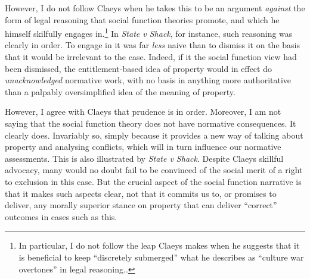 However, I do not follow Claeys when he takes this to be an argument {\it against} the form of legal reasoning that social function theories promote, and which he himself skilfully engages in.\footnote{In particular, I do not follow the leap Claeys makes when he suggests that it is beneficial to keep ``discretely submerged'' what he describes as ``culture war overtones'' in legal reasoning.\cite[947]{claeys09}.} In {\it State v Shack}, for instance, such reasoning was clearly in order. To engage in it was far {\it less} naive than to dismiss it on the basis that it would be irrelevant to the case. Indeed, if it the social function view had been dismissed, the entitlement-based idea of property would in effect do {\it unacknowledged} normative work, with no basis in anything more authoritative than a palpably oversimplified idea of the meaning of property. 

However, I agree with Claeys that prudence is in order. Moreover, I am not saying that the social function theory does not have normative consequences. It clearly does. Invariably so, simply because it provides a new way of talking about property and analysing conflicts, which will in turn influence our normative assessments. This is also illustrated by {\it State v Shack}. Despite Claeys skillful advocacy, many would no doubt fail to be convinced of the social merit of  a right to exclusion in this case. But the crucial aspect of the social function narrative is that it makes such aspects clear, not that it commits us to, or promises to deliver, any morally superior stance on property that can deliver ``correct'' outcomes in cases such as this.

